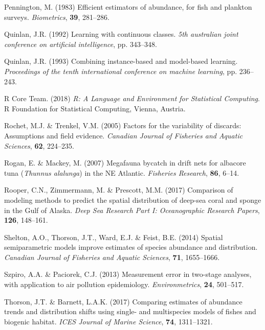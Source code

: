 \documentclass[]{article}
\begin{document}
\leavevmode\hypertarget{ref-pennington1983}{}%
Pennington, M. (1983) Efficient estimators of abundance, for fish and
plankton surveys. \emph{Biometrics}, \textbf{39}, 281--286.

\leavevmode\hypertarget{ref-quinlan1992}{}%
Quinlan, J.R. (1992) Learning with continuous classes. \emph{5th
australian joint conference on artificial intelligence}, pp. 343--348.

\leavevmode\hypertarget{ref-quinlan1993}{}%
Quinlan, J.R. (1993) Combining instance-based and model-based learning.
\emph{Proceedings of the tenth international conference on machine
learning}, pp. 236--243.

\leavevmode\hypertarget{ref-rcoreteam2018}{}%
R Core Team. (2018) \emph{R: A Language and Environment for Statistical
Computing}. R Foundation for Statistical Computing, Vienna, Austria.

\leavevmode\hypertarget{ref-rochet2005}{}%
Rochet, M.J. \& Trenkel, V.M. (2005) Factors for the variability of
discards: Assumptions and field evidence. \emph{Canadian Journal of
Fisheries and Aquatic Sciences}, \textbf{62}, 224--235.

\leavevmode\hypertarget{ref-rogan2007}{}%
Rogan, E. \& Mackey, M. (2007) Megafauna bycatch in drift nets for
albacore tuna (\emph{Thunnus alalunga}) in the NE Atlantic.
\emph{Fisheries Research}, \textbf{86}, 6--14.

\leavevmode\hypertarget{ref-rooper2017}{}%
Rooper, C.N., Zimmermann, M. \& Prescott, M.M. (2017) Comparison of
modeling methods to predict the spatial distribution of deep-sea coral
and sponge in the Gulf of Alaska. \emph{Deep Sea Research Part I:
Oceanographic Research Papers}, \textbf{126}, 148--161.

\leavevmode\hypertarget{ref-shelton2014}{}%
Shelton, A.O., Thorson, J.T., Ward, E.J. \& Feist, B.E. (2014) Spatial
semiparametric models improve estimates of species abundance and
distribution. \emph{Canadian Journal of Fisheries and Aquatic Sciences},
\textbf{71}, 1655--1666.

\leavevmode\hypertarget{ref-szpiro2013}{}%
Szpiro, A.A. \& Paciorek, C.J. (2013) Measurement error in two-stage
analyses, with application to air pollution epidemiology.
\emph{Environmetrics}, \textbf{24}, 501--517.

\leavevmode\hypertarget{ref-thorson2017vast}{}%
Thorson, J.T. \& Barnett, L.A.K. (2017) Comparing estimates of abundance
trends and distribution shifts using single- and multispecies models of
fishes and biogenic habitat. \emph{ICES Journal of Marine Science},
\textbf{74}, 1311--1321.
\end{document}
